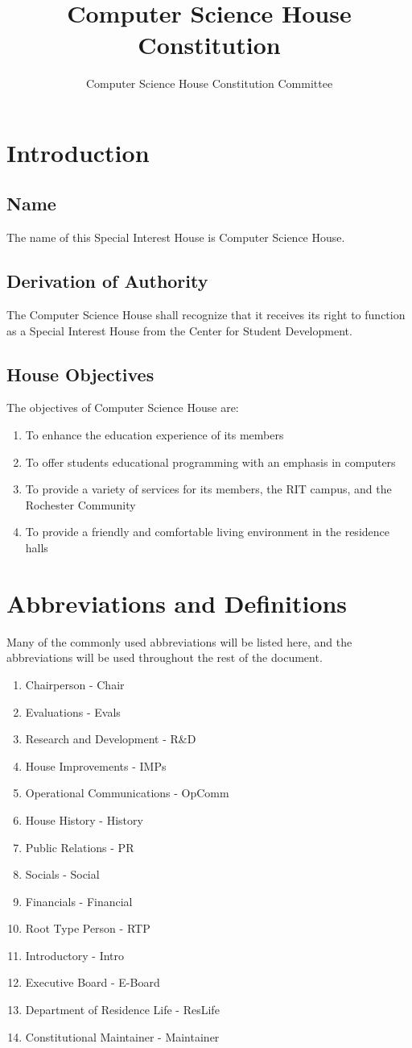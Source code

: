 \documentclass{article}
\title{Computer Science House Constitution}
\author{Computer Science House Constitution Committee}
\date{\datechanged}
\newcommand{\article}[1]{\section{#1} \label{#1}}
\newcommand{\asection}[1]{\subsection{#1} \label{#1}}
\begin{document}
\maketitle

\tableofcontents

\article{Introduction}

\asection{Name}
The name of this Special Interest House is Computer Science House.

\asection{Derivation of Authority}
The Computer Science House shall recognize that it receives its right to function as a Special Interest House from the Center for Student Development.

\asection{House Objectives}
The objectives of Computer Science House are:
\begin{enumerate}
	\item To enhance the education experience of its members
	\item To offer students educational programming with an emphasis in computers
	\item To provide a variety of services for its members, the RIT campus, and the Rochester Community
	\item To provide a friendly and comfortable living environment in the residence halls
\end{enumerate}

\article{Abbreviations and Definitions}
Many of the commonly used abbreviations will be listed here, and the abbreviations will be used throughout the rest of the document.

\begin{enumerate}
	\item Chairperson - Chair
	\item Evaluations - Evals
	\item Research and Development - R\&D
	\item House Improvements - IMPs
	\item Operational Communications - OpComm
	\item House History - History
	\item Public Relations - PR
	\item Socials - Social
	\item Financials - Financial
	\item Root Type Person - RTP
	\item Introductory - Intro
	\item Executive Board - E-Board
	\item Department of Residence Life - ResLife
	\item Constitutional Maintainer - Maintainer
\end{enumerate}
\end{document}
